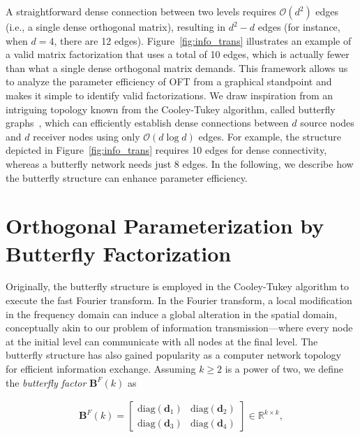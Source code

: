 A straightforward dense connection between two levels requires $\mathcal{O}(d^2)$ edges (i.e., a single dense orthogonal matrix), resulting in $d^2 - d$ edges (for instance, when $d=4$, there are 12 edges). Figure~\ref{fig:info_trans} illustrates an example of a valid matrix factorization that uses a total of 10 edges, which is actually fewer than what a single dense orthogonal matrix demands. This framework allows us to analyze the parameter efficiency of OFT from a graphical standpoint and makes it simple to identify valid factorizations. We draw inspiration from an intriguing topology known from the Cooley-Tukey algorithm, called butterfly graphs~\cite{cooley1965algorithm}, which can efficiently establish dense connections between $d$ source nodes and $d$ receiver nodes using only $\mathcal{O}(d\log d)$ edges. For example, the structure depicted in Figure~\ref{fig:info_trans} requires 10 edges for dense connectivity, whereas a butterfly network needs just 8 edges. In the following, we describe how the butterfly structure can enhance parameter efficiency.

\section{Orthogonal Parameterization by Butterfly Factorization}

Originally, the butterfly structure is employed in the Cooley-Tukey algorithm to execute the fast Fourier transform. In the Fourier transform, a local modification in the frequency domain can induce a global alteration in the spatial domain, conceptually akin to our problem of information transmission—where every node at the initial level can communicate with all nodes at the final level. The butterfly structure has also gained popularity as a computer network topology~\cite{solihin2015fundamentals,li2011linear} for efficient information exchange. Assuming $k \geq 2$ is a power of two, we define the \emph{butterfly factor} $\bm{B}^F(k)$ as

\begin{equation}\label{eq:but_factor}
\begin{aligned}
    \bm{B}^F(k)=\begin{bmatrix}
    \text{diag}(\bm{d}_1) & \text{diag}(\bm{d}_2) \\
    \text{diag}(\bm{d}_3) & \text{diag}(\bm{d}_4)
    \end{bmatrix} \in \mathbb{R}^{k \times k},
\end{aligned}
\end{equation}

